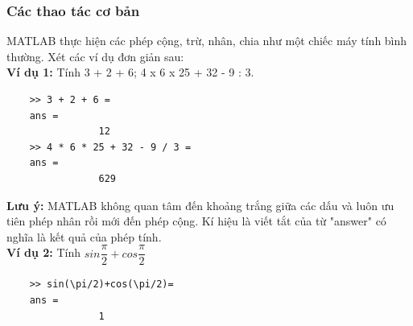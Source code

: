 \documentclass[12pt,a4paper]{article}
\begin{document}
\subsubsection{Các thao tác cơ bản}
MATLAB thực hiện các phép cộng, trừ, nhân, chia như một chiếc máy tính bình thường. Xét các ví dụ đơn giản sau:\\
\textbf{Ví dụ 1:} Tính 3 + 2 + 6; 4 x 6 x 25 + 32 - 9 : 3.
\begin{lstlisting}
	>> 3 + 2 + 6 =
	ans =
				12
	>> 4 * 6 * 25 + 32 - 9 / 3 =
	ans =
				629
\end{lstlisting}
\textbf{Lưu ý:} MATLAB không quan tâm đến khoảng trắng giữa các dấu và luôn ưu tiên phép nhân rồi mới đến phép cộng. Kí hiệu  là viết tắt của từ "answer" có nghĩa là kết quả của phép tính.\\
\textbf{Ví dụ 2:} Tính $sin{\dfrac{\pi}{2}}+cos{\dfrac{\pi}{2}}$\\
\begin{lstlisting}
	>> sin(\pi/2)+cos(\pi/2)=
	ans =
				1
\end{lstlisting}
\end{document}
